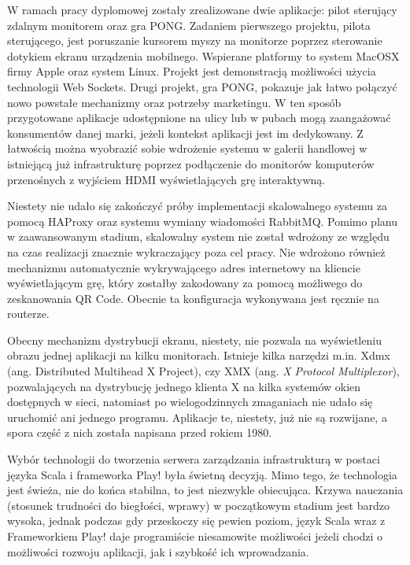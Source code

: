 W ramach pracy dyplomowej zostały zrealizowane dwie aplikacje: pilot sterujący zdalnym monitorem oraz gra PONG. Zadaniem pierwszego projektu, pilota sterującego, jest poruszanie kursorem myszy na monitorze poprzez sterowanie dotykiem ekranu urządzenia mobilnego. Wspierane platformy to system MacOSX firmy Apple oraz system Linux. Projekt jest demonstracją możliwości użycia technologii Web Sockets. Drugi projekt, gra PONG, pokazuje jak łatwo połączyć nowo powstałe mechanizmy oraz potrzeby marketingu. W ten sposób przygotowane aplikacje udostępnione na ulicy lub w pubach mogą zaangażować konsumentów danej marki, jeżeli kontekst aplikacji jest im dedykowany. Z łatwością można wyobrazić sobie wdrożenie systemu w galerii handlowej w istniejącą już infrastrukturę poprzez podłączenie do monitorów komputerów przenośnych z wyjściem HDMI wyświetlających grę interaktywną.

Niestety nie udało się zakończyć próby implementacji skalowalnego systemu za pomocą HAProxy oraz systemu wymiany wiadomości RabbitMQ. Pomimo planu w zaawansowanym stadium, skalowalny system nie został wdrożony ze względu na czas realizacji znacznie wykraczający poza cel pracy. Nie wdrożono również mechanizmu automatycznie wykrywającego adres internetowy na kliencie wyświetlającym grę, który zostałby zakodowany za pomocą możliwego do zeskanowania QR Code. Obecnie ta konfiguracja wykonywana jest ręcznie na routerze.

Obecny mechanizm dystrybucji ekranu, niestety, nie pozwala na wyświetleniu obrazu jednej aplikacji na kilku monitorach. Istnieje kilka narzędzi m.in. Xdmx (ang. Distributed Multihead X Project), czy XMX (ang. \emph{X Protocol Multiplexor}), pozwalających na dystrybucję jednego klienta X na kilka systemów okien dostępnych w sieci, natomiast po wielogodzinnych zmaganiach nie udało się uruchomić ani jednego programu. Aplikacje te, niestety, już nie są rozwijane, a spora część z nich została napisana przed rokiem 1980.

Wybór technologii do tworzenia serwera zarządzania infrastrukturą w postaci języka Scala i frameworka Play! była świetną decyzją. Mimo tego, że technologia jest świeża, nie do końca stabilna, to jest niezwykle obiecująca. Krzywa nauczania (stosunek trudności do biegłości, wprawy) w początkowym stadium jest bardzo wysoka, jednak podczas gdy przeskoczy się pewien poziom, język Scala wraz z Frameworkiem Play! daje programiście niesamowite możliwości jeżeli chodzi o możliwości rozwoju aplikacji, jak i szybkość ich wprowadzania.

